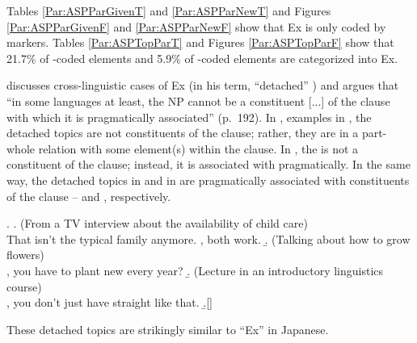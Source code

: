 Tables \ref{Par:ASPParGivenT} and \ref{Par:ASPParNewT} and
Figures \ref{Par:ASPParGivenF} and \ref{Par:ASPParNewF}
show that Ex is only coded by  markers.
Tables \ref{Par:ASPTopParT} and Figures \ref{Par:ASPTopParF}
show that 21.7\% of -coded elements and
5.9\% of -coded elements are categorized into Ex.

discusses cross-linguistic cases of Ex (in his term, ``detached'' )
and argues that
``in some languages at least, the  NP cannot be a constituent [...] of the clause with which it is pragmatically associated'' (p.~192).
In \Next, examples in ,
the detached topics are not constituents of the clause;
rather, they are in a part-whole relation with some element(s) within the clause.
In \Next[a], the   is not a constituent of the clause;
instead, it is associated with  pragmatically.
In the same way, the detached topics  in \Next[b] and
 in \Next[c]
are pragmatically associated with constituents of the clause --  and , respectively.
%

\newpage
\ex.
 \a. (From a TV interview about the availability of child care) \\
   That isn't the typical family anymore.
   ,
    both work.
 \b. (Talking about how to grow flowers) \\
   , you have to plant new  every year?
 \b. (Lecture in an introductory linguistics course) \\
   , you don't just have straight  like that.
  \b.[] \hfill{\cite[193]{lambrecht94}}

These detached topics are strikingly similar to
``Ex'' in Japanese.

